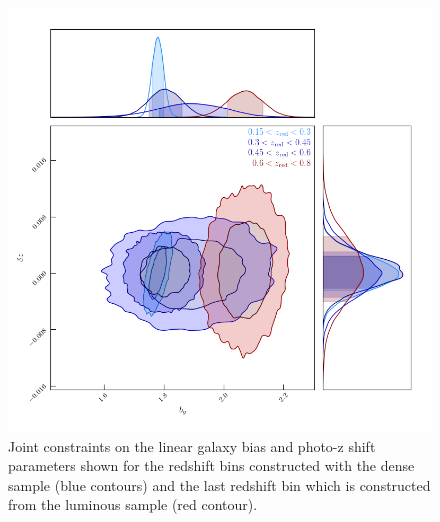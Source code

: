 \documentclass{aa}
\numberwithin{equation}{section}
\begin{document}
{\begin{figure}
\includegraphics[width=\columnwidth]{figures_tmp/joint_estimate.png}
\caption{ Joint constraints on the linear galaxy bias and photo-z shift parameters shown for the redshift bins constructed with the dense sample (blue contours) and the last redshift bin which is constructed from the luminous sample (red contour).} 
\label{fig:joint_estimate}
\end{figure}

}
\end{document}
